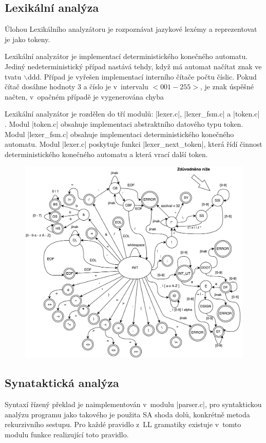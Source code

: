 \subsection{Lexikální analýza}
\label{subsec:lexer}
Úlohou Lexikálního analyzátoru je rozpoznávat jazykové lexémy a reprezentovat
je jako tokeny.

Lexikální analyzátor je implementací deterministického konečného
automatu. Jediný nedeterministický případ nastává tehdy, když má automat načítat znak ve tvatu $\backslash$ddd.
Případ je vyřešen implementací interního čítače počtu číslic. Pokud čítač dosáhne hodnoty 3 a číslo je
v~intervalu $<001-255>$, je znak úspěšné načten, v~opačném případě je vygenerována chyba

Lexikální analyzátor je rozdělen do tří modulů: \ic|lexer.c|, \ic|lexer_fsm.c| a \ic|token.c|
. Modul \ic|token.c| obsahuje implementaci abstraktního datového typu token. Modul \ic|lexer_fsm.c|
obsahuje implementaci deterministického konečného automatu. Modul \ic|lexer.c| poskytuje funkci
\ic|lexer_next_token|, která řídí činnost deterministického konečného automatu a
která vrací další token.

\vspace*{16px}
\begin{figure}[htbp]
    \centering
    \includegraphics[width=1\textwidth, angle=0]{src/assets/automat.pdf}
\end{figure}

\subsection{Synataktická analýza}
Syntaxí řízený překlad je naimplementován v~modulu \ic|parser.c|, pro syntaktickou analýzu programu jako takového je
použita SA shoda dolů, konkrétně metoda rekurzivního sestupu. Pro každé pravidlo z~LL gramatiky existuje v~tomto
modulu funkce realizující toto pravidlo.

